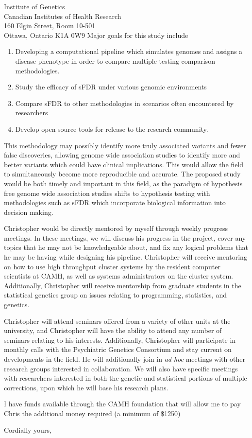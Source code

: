 \documentclass{letter}
\begin{document}
\begin{letter}{Institute of Genetics \\ Canadian Institutes of Health Research \\ 160 Elgin Street, Room 10-501 \\ Ottawa, Ontario K1A 0W9}
Major goals for this study include

\begin{enumerate}
	\item Developing a computational pipeline which simulates genomes and assigns a disease phenotype in order to compare multiple testing comparison methodologies. 
	\item Study the efficacy of sFDR under various genomic environments
	\item Compare sFDR to other methodologies in scenarios often encountered by researchers
	\item Develop open source tools for release to the research community.
\end{enumerate}

This methodology may possibly identify more truly associated variants and fewer false discoveries, allowing genome wide association studies to identify more and better variants which could have clinical implications. This would allow the field to simultaneously become more reproducible and accurate. The proposed study would be both timely and important in this field, as the paradigm of hypothesis free genome wide association studies shifts to hypothesis testing with methodologies such as sFDR which incorporate biological information into decision making. 

Christopher would be directly mentored by myself through weekly progress meetings. In these meetings, we will discuss his progress in the project, cover any topics that he may not be knowledgeable about, and fix any logical problems that he may be having while designing his pipeline. Christopher will receive mentoring on how to use high throughput cluster systems by the resident computer scientists at CAMH, as well as systems administrators on the cluster system. Additionally, Christopher will receive mentorship from graduate students in the statistical genetics group on issues relating to programming, statistics, and genetics. 

Christopher will attend seminars offered from a variety of other units at the university, and Christopher will have the ability to attend any number of seminars relating to his interests. Additionally, Christopher will participate in monthly calls with the Psychiatric Genetics Consortium and stay current on developments in the field. He will additionally join in \textit{ad hoc} meetings with other research groups interested in collaboration. We will also have specific meetings with researchers interested in both the genetic and statistical portions of multiple corrections, upon which he will base his research plans. 

I have funds available through the CAMH foundation that will allow me to pay Chris the additional money required (a minimum of \$1250)

\closing{Cordially yours,}
\end{letter}
\end{document}
